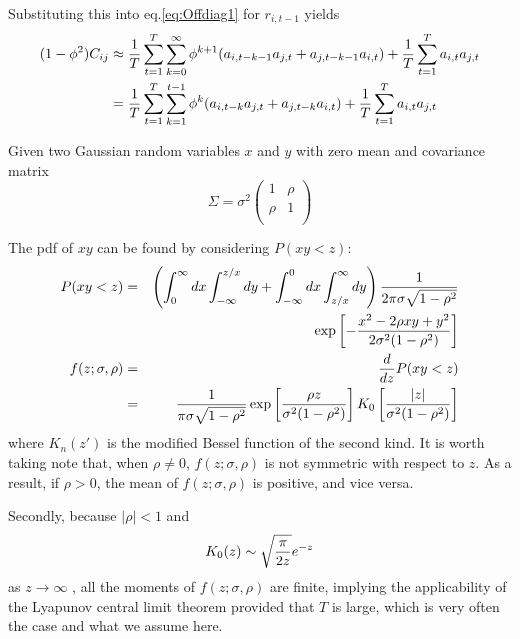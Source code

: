 Substituting this into eq.\ref{eq:Offdiag1} for $r_{i,t-1}$ yields
\begin{equation}
  \label{eq:Offdiag2}
  \begin{aligned}
  (1 - \phi^2)C_{ij} &\approx
  {1 \over T} \sum_{t=1}^T \sum_{k=0}^\infty\phi^{k+1} (a_{i, t-k-1}
  a_{j, t} + a_{j, t-k-1} a_{i, t})
  + {1 \over T} \sum_{t=1}^T a_{i,t} a_{j,t} \\
  &=
  {1 \over T} \sum_{t=1}^{T} \sum_{k=1}^{t-1}\phi^k (a_{i, t-k}
  a_{j, t} + a_{j, t-k} a_{i, t})
  + {1 \over T} \sum_{t=1}^{T} a_{i,t} a_{j,t}\\
  \end{aligned}
\end{equation}

Given two Gaussian random variables $x$ and $y$ with zero mean and
covariance matrix 
\begin{equation*}
  \Sigma = \sigma^2
  \begin{pmatrix}
    1 & \rho \\
    \rho & 1 \\
  \end{pmatrix}
\end{equation*}

The \gls{pdf} of $xy$ can be found by considering $P(xy < z)$:
\begin{eqnarray*}
  P(xy < z) &=& \left(\int_0^\infty dx \int_{-\infty}^{z/x} dy
    +\int_{-\infty}^0 dx \int_{z/x}^\infty dy \right)
    {1 \over 2\pi\sigma\sqrt{1 - \rho^2}} \\
    &&
    \exp\left[
      -{x^2 -2\rho xy + y^2
        \over
        2\sigma^2 (1 - \rho^2)} 
    \right] \\
  f(z; \sigma, \rho) &=& {d \over dz} P(xy < z)\\
  &=& {1 \over \pi \sigma \sqrt{1 - \rho^2}} \exp\left[
    {\rho z \over \sigma^2 (1 - \rho^2)}\right] K_0\left[
    {|z| \over \sigma^2 (1 - \rho^2)}
  \right]
\end{eqnarray*}
where $K_n(z')$ is the modified Bessel function of the second
kind. It is worth taking note that, when $\rho \neq 0$,
$f(z; \sigma, \rho)$ is not symmetric with respect to
$z$. As a result, if $\rho > 0$, the mean of $f(z;
\sigma, \rho)$ is positive, and vice versa.

Secondly, because $|\rho| < 1$ and
\begin{equation*}
  K_0(z) \sim \sqrt{\pi \over 2z} e^{-z}
\end{equation*}
as $z \to \infty$ \cite{Olver:2010:NHMF}, all the moments of
$f(z; \sigma, \rho)$ are finite, implying the
applicability of the Lyapunov central limit theorem provided that $T$
is large, which is very often the case and what we assume here.

